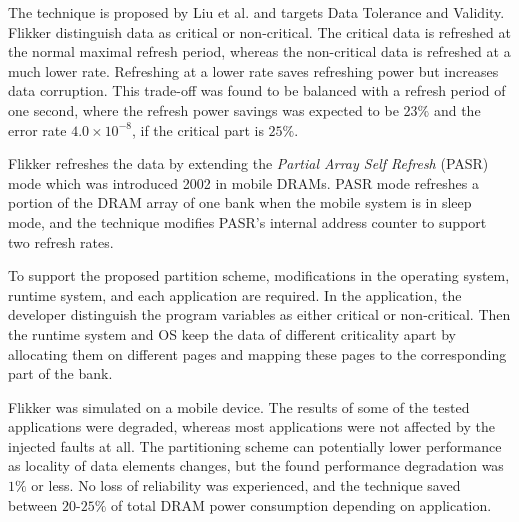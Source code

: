 The technique is proposed by Liu et al. \cite{flikker} and targets Data Tolerance and Validity. Flikker distinguish data as critical or non-critical. The critical data is refreshed at the normal maximal refresh period, whereas the non-critical data is refreshed at a much lower rate. Refreshing at a lower rate saves refreshing power but increases data corruption. This trade-off was found to be balanced with a refresh period of one second, where the refresh power savings was expected to be $23\%$ and the error rate $4.0 \times 10^{-8}$, if the critical part is $25\%$.

Flikker refreshes the data by extending the \textit{Partial Array Self Refresh} (PASR) mode which was introduced 2002 in mobile DRAMs. PASR mode refreshes a portion of the DRAM array of one bank when the mobile system is in sleep mode, and the technique modifies PASR's internal address counter to support two refresh rates.

To support the proposed partition scheme, modifications in the operating system, runtime system, and each application are required. In the application, the developer distinguish the program variables as either critical or non-critical. Then the runtime system and OS keep the data of different criticality apart by allocating them on different pages and mapping these pages to the corresponding part of the bank.


Flikker was simulated on a mobile device. The results of some of the tested applications were degraded, whereas most applications were not affected by the injected faults at all. The partitioning scheme can potentially lower performance as locality of data elements changes, but the found performance degradation was $1\%$ or less. No loss of reliability was experienced, and the technique saved between $20$-$25\%$ of total DRAM power consumption depending on application.